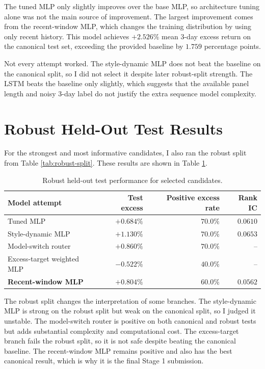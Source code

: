 \documentclass[11pt]{article}
\begin{document}
The tuned MLP only slightly improves over the base MLP, so architecture tuning
alone was not the main source of improvement. The largest improvement comes
from the recent-window MLP, which changes the training distribution by using
only recent history. This model achieves \(+2.526\%\) mean 3-day excess return
on the canonical test set, exceeding the provided baseline by \(1.759\)
percentage points.

Not every attempt worked. The style-dynamic MLP does not beat the baseline on
the canonical split, so I did not select it despite later robust-split
strength. The LSTM beats the baseline only slightly, which suggests that the
available panel length and noisy 3-day label do not justify the extra sequence
model complexity.

\section{Robust Held-Out Test Results}

For the strongest and most informative candidates, I also ran the robust split
from Table \ref{tab:robust-split}. These results are shown in Table
\ref{tab:robust-results}.

\begin{table}[h]
\centering
\caption{Robust held-out test performance for selected candidates.}
\label{tab:robust-results}
\begin{tabular}{lrrr}
\toprule
Model attempt & Test excess & Positive excess rate & Rank IC \\
\midrule
Tuned MLP & \(+0.684\%\) & \(70.0\%\) & \(0.0610\) \\
Style-dynamic MLP & \(+1.130\%\) & \(70.0\%\) & \(0.0653\) \\
Model-switch router & \(+0.860\%\) & \(70.0\%\) & -- \\
Excess-target weighted MLP & \(-0.522\%\) & \(40.0\%\) & -- \\
\textbf{Recent-window MLP} & \(\mathbf{+0.804\%}\) & \(60.0\%\) & \(0.0562\) \\
\bottomrule
\end{tabular}
\end{table}

The robust split changes the interpretation of some branches. The style-dynamic
MLP is strong on the robust split but weak on the canonical split, so I judged
it unstable. The model-switch router is positive on both canonical and robust
tests but adds substantial complexity and computational cost. The excess-target
branch fails the robust split, so it is not safe despite beating the canonical
baseline. The recent-window MLP remains positive and also has the best
canonical result, which is why it is the final Stage 1 submission.
\end{document}

